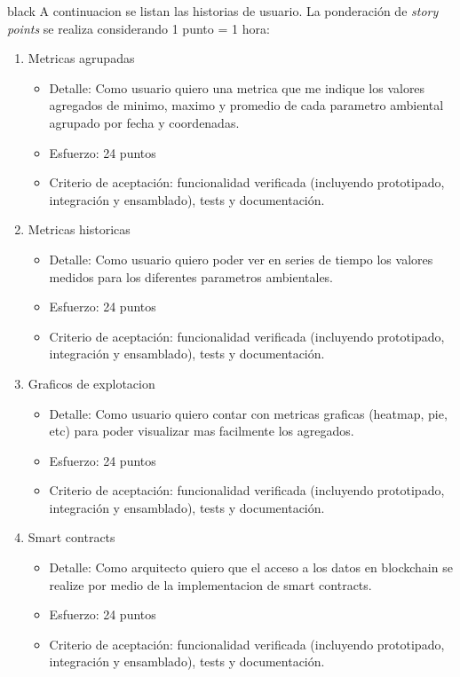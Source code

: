 \documentclass[
11pt, %
]{charter}
\begin{document}
\begin{consigna}{black}
A continuacion se listan las historias de usuario. La ponderación de \textit{story points} se realiza considerando 1 punto = 1 hora:


\begin{enumerate}

	\item Metricas agrupadas
	\begin{itemize}
		\item Detalle: Como usuario quiero una metrica que me indique los valores agregados de minimo, maximo y promedio de cada parametro ambiental agrupado por fecha y coordenadas.
		\item Esfuerzo: 24 puntos
		\item Criterio de aceptación: funcionalidad verificada (incluyendo prototipado, integración y ensamblado), tests y documentación.
	\end{itemize}
	
	\item Metricas historicas
	\begin{itemize}
		\item Detalle: Como usuario quiero poder ver en series de tiempo los valores medidos para los diferentes parametros ambientales.
		\item Esfuerzo: 24 puntos
		\item Criterio de aceptación: funcionalidad verificada (incluyendo prototipado, integración y ensamblado), tests y documentación.
	\end{itemize}
	
	\item Graficos de explotacion
	\begin{itemize}
		\item Detalle: Como usuario quiero contar con metricas graficas (heatmap, pie, etc) para poder visualizar mas facilmente los agregados.
		\item Esfuerzo: 24 puntos
		\item Criterio de aceptación: funcionalidad verificada (incluyendo prototipado, integración y ensamblado), tests y documentación.
	\end{itemize}
	
	\item Smart contracts
	\begin{itemize}
		\item Detalle: Como arquitecto quiero que el acceso a los datos en blockchain se realize por medio de la implementacion de smart contracts.
		\item Esfuerzo: 24 puntos
		\item Criterio de aceptación: funcionalidad verificada (incluyendo prototipado, integración y ensamblado), tests y documentación.
	\end{itemize}
	

\end{enumerate}
\end{consigna}
\end{document}
